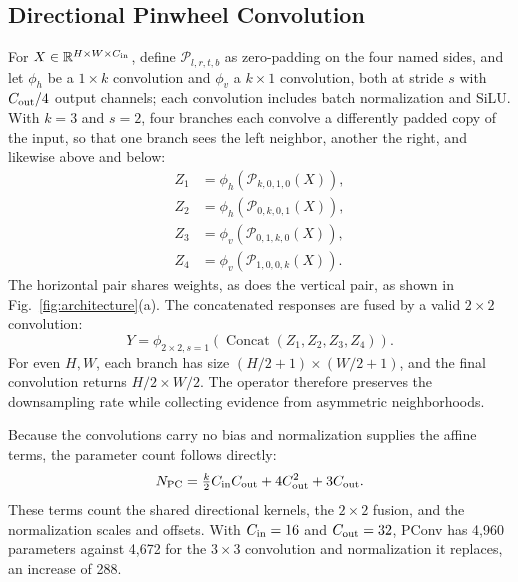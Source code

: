 \documentclass[lettersize,journal]{IEEEtran}
\begin{document}
\subsection{Directional Pinwheel Convolution}
For $X\in\mathbb{R}^{H\times W\times C_{\rm in}}$, define $\mathcal P_{l,r,t,b}$ as zero-padding on the four named sides, and let $\phi_h$ be a $1\times k$ convolution and $\phi_v$ a $k\times1$ convolution, both at stride $s$ with $C_{\rm out}/4$ output channels; each convolution includes batch normalization\cite{ioffe2015batchnorm} and SiLU. With $k=3$ and $s=2$, four branches each convolve a differently padded copy of the input, so that one branch sees the left neighbor, another the right, and likewise above and below:
\begin{equation}
\begin{aligned}
Z_1&=\phi_h(\mathcal P_{k,0,1,0}(X)),\\
Z_2&=\phi_h(\mathcal P_{0,k,0,1}(X)),\\
Z_3&=\phi_v(\mathcal P_{0,1,k,0}(X)),\\
Z_4&=\phi_v(\mathcal P_{1,0,0,k}(X)).
\end{aligned}
\label{eq:pconvbranches}
\end{equation}
The horizontal pair shares weights, as does the vertical pair, as shown in Fig.~\ref{fig:architecture}(a). The concatenated responses are fused by a valid $2\times2$ convolution:
\begin{equation}
Y=\phi_{2\times2,s=1}\!\left(\operatorname{Concat}(Z_1,Z_2,Z_3,Z_4)\right).
\label{eq:pconvfuse}
\end{equation}
For even $H,W$, each branch has size $(H/2+1)\times(W/2+1)$, and the final convolution returns $H/2\times W/2$. The operator therefore preserves the downsampling rate while collecting evidence from asymmetric neighborhoods.

Because the convolutions carry no bias and normalization supplies the affine terms, the parameter count follows directly:
\begin{equation}
N_{\rm PC}=\tfrac{k}{2}C_{\rm in}C_{\rm out}+4C_{\rm out}^{2}+3C_{\rm out}.
\label{eq:pcparams}
\end{equation}
These terms count the shared directional kernels, the $2\times2$ fusion, and the normalization scales and offsets. With $C_{\rm in}=16$ and $C_{\rm out}=32$, PConv has 4,960 parameters against 4,672 for the $3\times3$ convolution and normalization it replaces, an increase of 288.
\end{document}
